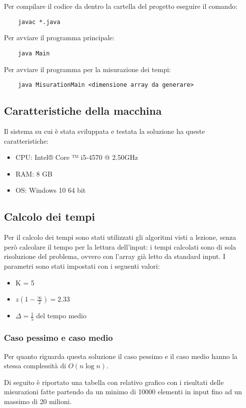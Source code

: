 \documentclass{article}
\begin{document}
Per compilare il codice da dentro la cartella del progetto eseguire il comando: 
\begin{verbatim}
    javac *.java
\end{verbatim}
Per avviare il programma principale:
\begin{verbatim}
    java Main
\end{verbatim}
Per avviare il programma per la misurazione dei tempi:
\begin{verbatim}
    java MisurationMain <dimensione array da generare>
\end{verbatim}

\subsection{Caratteristiche della macchina}

Il sistema su cui è stata sviluppata e testata la soluzione ha queste caratteristiche:
\begin{itemize}
    \item CPU: Intel® Core ™ i5-4570 @ 2.50GHz
    \item RAM: 8 GB
    \item OS: Windows 10 64 bit
\end{itemize}
\subsection{Calcolo dei tempi}
Per il calcolo dei tempi sono stati utilizzati gli algoritmi visti a lezione, senza però calcolare il tempo per la lettura dell’input: i tempi calcolati sono di sola risoluzione del problema, ovvero con l'array già letto da standard input.
I parametri sono stati impostati con i seguenti valori:
\begin{itemize}
    \item K = 5%
    \item $z(1-\frac{\infty}{2})=2.33$
    \item $\Delta = \frac{1}{5}$ del tempo medio
\end{itemize}

\subsubsection{Caso pessimo e caso medio}

Per quanto riguarda questa soluzione il caso pessimo e il caso medio hanno la stessa complessità di $O(n\log n)$.

Di seguito è riportato una tabella con relativo grafico con i risultati delle misurazioni fatte partendo da un minimo di 10000 elementi in input fino ad un massimo di 20 milioni.
\end{document}
